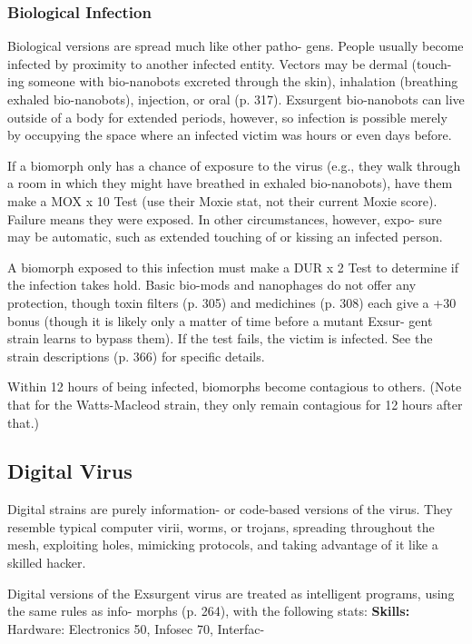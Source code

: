 \subsubsection{Biological Infection}

Biological versions are spread much like other patho-
gens. People usually become infected by proximity to 
another infected entity. Vectors may be dermal (touch-
ing someone with bio-nanobots excreted through the 
skin), inhalation (breathing exhaled bio-nanobots), 
injection, or oral (p. 317). Exsurgent bio-nanobots can 
live outside of a body for extended periods, however, 
so infection is possible merely by occupying the space 
where an infected victim was hours or even days before.

If a biomorph only has a chance of exposure to the 
virus (e.g., they walk through a room in which they 
might have breathed in exhaled bio-nanobots), have 
them make a MOX x 10 Test (use their Moxie stat, 
not their current Moxie score). Failure means they 
were exposed. In other circumstances, however, expo-
sure may be automatic, such as extended touching of 
or kissing an infected person. 

A biomorph exposed to this infection must make 
a DUR x 2 Test to determine if the infection takes 
hold. Basic bio-mods and nanophages do not offer 
any protection, though toxin filters (p. 305) and 
medichines (p. 308) each give a +30 bonus (though it 
is likely only a matter of time before a mutant Exsur-
gent strain learns to bypass them). If the test fails, the 
victim is infected. See the strain descriptions (p. 366) 
for specific details.

Within 12 hours of being infected, biomorphs 
become contagious to others. (Note that for the 
Watts-Macleod strain, they only remain contagious 
for 12 hours after that.)

\subsection{Digital Virus}

Digital strains are purely information- or code-based 
versions of the virus. They resemble typical computer 
virii, worms, or trojans, spreading throughout the 
mesh, exploiting holes, mimicking protocols, and 
taking advantage of it like a skilled hacker.

Digital versions of the Exsurgent virus are treated 
as intelligent programs, using the same rules as info-
morphs (p. 264), with the following stats:
\textbf{Skills:} Hardware: Electronics 50, Infosec 70, Interfac-

